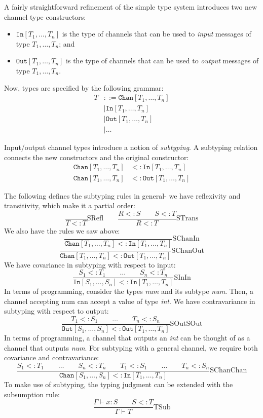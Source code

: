 \documentclass[a4paper, openany]{memoir}
\theoremstyle{definition}
\begin{document}
    A fairly straightforward refinement of the simple type system introduces two new channel type constructors:
    \begin{itemize}
        \item $\texttt{In}[T_1, \dots, T_n]$ is the type of channels that can be used to \emph{input} messages of type $T_1, \dots, T_n$; and
        \item $\texttt{Out}[T_1, \dots, T_n]$ is the type of channels that can be used to \emph{output} messages of type $T_1, \dots, T_n$.
    \end{itemize}
    Now, types are specified by the following grammar:
    \begin{align*}
        T &::= \texttt{Chan}[T_1, \dots, T_n] \\
        &\mid \texttt{In}[T_1, \dots, T_n] \\
        &\mid \texttt{Out}[T_1, \dots, T_n] \\
        &\mid \dots
    \end{align*}
    
    Input/output channel types introduce a notion of \emph{subtyping}. A subtyping relation connects the new constructors and the original constructor:
    \begin{align*}
        \texttt{Chan}[T_1, \dots, T_n] &<: \texttt{In}[T_1, \dots, T_n] \\
        \texttt{Chan}[T_1, \dots, T_n] &<: \texttt{Out}[T_1, \dots, T_n] 
    \end{align*}

    The following defines the subtyping rules in general- we have reflexivity and transitivity, which make it a partial order:
    \[\frac{}{T <: T} \textrm{SRefl} \qquad \frac{R <: S \qquad S <: T}{R <: T} \textrm{STrans}\]
    We also have the rules we saw above:
    \[\frac{}{\texttt{Chan}[T_1, \dots, T_n] <: \texttt{In}[T_1, \dots, T_n]} \textrm{SChanIn}\]
    \[\frac{}{\texttt{Chan}[T_1, \dots, T_n] <: \texttt{Out}[T_1, \dots, T_n]} \textrm{SChanOut}\]
    We have covariance in subtyping with respect to input:
    \[\frac{S_1 <: T_1 \qquad \dots \qquad S_n <: T_n}{\texttt{In}[S_1, \dots, S_n] <: \texttt{In}[T_1, \dots, T_n]} \textrm{SInIn}\]
    In terms of programming, consider the types \textit{num} and its subtype \textit{num}. Then, a channel accepting \textrm{num} can accept a value of type \textit{int}. We have contravariance in subtyping with respect to output:
    \[\frac{T_1 <: S_1 \qquad \dots \qquad T_n <: S_n}{\texttt{Out}[S_1, \dots, S_n] <: \texttt{Out}[T_1, \dots, T_n]} \textrm{SOutSOut}\]
    In terms of programming, a channel that outputs an \textit{int} can be thought of as a channel that outputs \textit{num}. For subtyping with a general channel, we require both covariance and contravariance:
    \[\frac{S_1 <: T_1 \qquad \dots \qquad S_n <: T_n \qquad T_1 <: S_1 \qquad \dots \qquad T_n <: S_n}{\texttt{Chan}[S_1, \dots, S_n] <: \texttt{In}[T_1, \dots, T_n]} \textrm{SChanChan}\]
    To make use of subtyping, the typing judgment can be extended with the subsumption rule:
    \[\frac{\Gamma \vdash x \colon S \qquad S <: T}{\Gamma \vdash T} \textrm{TSub}\]
\end{document}
